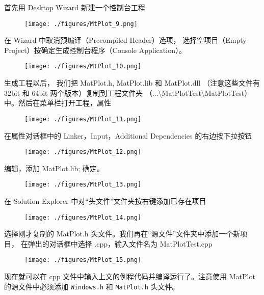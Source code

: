 首先用 Desktop Wizard 新建一个控制台工程
\begin{figure}[ht]
\centering
\texttt{[image: ./figures/MtPlot\_9.png]}
\caption{} \label{MtPlot_fig9}
\end{figure}

在 Wizard 中取消预编译（Precompiled Header）选项， 选择空项目（Empty Project）按确定生成控制台程序（Console Application）。

\begin{figure}[ht]
\centering
\texttt{[image: ./figures/MtPlot\_10.png]}
\caption{} \label{MtPlot_fig10}
\end{figure}

生成工程以后， 我们把 MatPlot.h, MatPlot.lib 和 MatPlot.dll （注意这些文件有 32bit 和 64bit 两个版本）复制到工程文件夹 （...\textbackslash MatPlotTest\textbackslash MatPlotTest）中。然后在菜单栏打开工程，属性

\begin{figure}[ht]
\centering
\texttt{[image: ./figures/MtPlot\_11.png]}
\caption{} \label{MtPlot_fig11}
\end{figure}

在属性对话框中的 Linker，Input，Additional Dependencies 的右边按下拉按钮

\begin{figure}[ht]
\centering
\texttt{[image: ./figures/MtPlot\_12.png]}
\caption{} \label{MtPlot_fig12}
\end{figure}

编辑，添加 MatPlot.lib; 确定。

\begin{figure}[ht]
\centering
\texttt{[image: ./figures/MtPlot\_13.png]}
\caption{} \label{MtPlot_fig13}
\end{figure}

在 Solution Explorer 中对“头文件”文件夹按右键添加已存在项目

\begin{figure}[ht]
\centering
\texttt{[image: ./figures/MtPlot\_14.png]}
\caption{} \label{MtPlot_fig14}
\end{figure}

选择刚才复制的 MatPlot.h 头文件。我们再在“源文件”文件夹中添加一个新项目， 在弹出的对话框中选择 .cpp，输入文件名为 MatPlotTest.cpp

\begin{figure}[ht]
\centering
\texttt{[image: ./figures/MtPlot\_15.png]}
\caption{} \label{MtPlot_fig15}
\end{figure}

现在就可以在 cpp 文件中输入上文的例程代码并编译运行了。注意使用 MatPlot 的源文件中必须添加 \verb|Windows.h| 和 \verb|MatPlot.h| 头文件。
